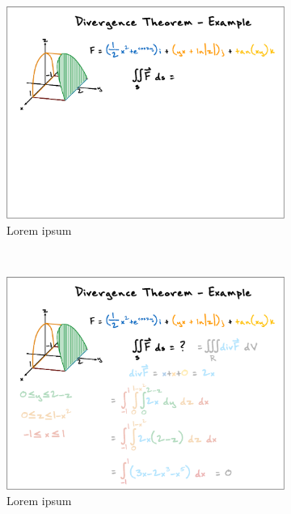 \begin{figure}[ht!]
    \centering
    \begin{subfigure}[t]{0.32\textwidth}
        \centering
        \includegraphics[width=1\columnwidth]{figures/videoslide1}
        \caption{Lorem ipsum}
    \end{subfigure}%
    ~ 
    \begin{subfigure}[t]{0.32\textwidth}
        \centering
        \includegraphics[width=1\columnwidth]{figures/videoslide2}
        \caption{Lorem ipsum}
    \end{subfigure}
    ~
        \begin{subfigure}[t]{0.32\textwidth}
        \centering

\end{subfigure}
\end{figure}

